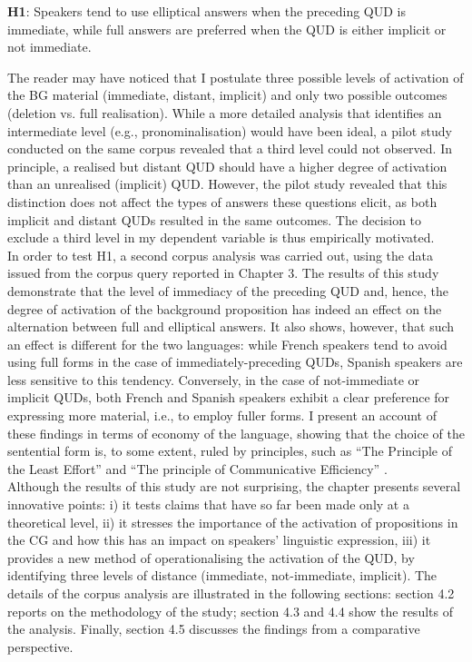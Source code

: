 \ea
\textbf{H1}: Speakers tend to use elliptical answers when the preceding QUD is immediate, while full answers are preferred when the QUD is either implicit or not immediate.\\
\z

The reader may have noticed that I postulate three possible levels of activation of the BG material (immediate, distant, implicit) and only two possible outcomes (deletion vs. full realisation). While a more detailed analysis that identifies an intermediate level (e.g., pronominalisation) would have been ideal, a pilot study conducted on the same corpus revealed that a third level could not observed. In principle, a realised but distant QUD should have a higher degree of activation than an unrealised (implicit) QUD. However, the pilot study revealed that this distinction does not affect the types of answers these questions elicit, as both implicit and distant QUDs resulted in the same outcomes. The decision to exclude a third level in my dependent variable is thus empirically motivated.\\
In order to test H1, a second corpus analysis was carried out, using the data issued from the corpus query reported in Chapter 3. The results of this study demonstrate that the level of immediacy of the preceding QUD and, hence, the degree of activation of the background proposition has indeed an effect on the alternation between full and elliptical answers. It also shows, however, that such an effect is different for the two languages: while French speakers tend to avoid using full forms in the case of immediately-preceding QUDs, Spanish speakers are less sensitive to this tendency. Conversely, in the case of not-immediate or implicit QUDs, both French and Spanish speakers exhibit a clear preference for expressing more material, i.e., to employ fuller forms. I present an account of these findings in terms of economy of the language, showing that the choice of the sentential form is, to some extent, ruled by principles, such as ``The Principle of the Least Effort” \parencite{zipf1949human} and ``The principle of Communicative Efficiency” \parencite{LevshinaMoran+2021, Levshina_2022}.\\
Although the results of this study are not surprising, the chapter presents several innovative points: i) it tests claims that have so far been made only at a theoretical level, ii) it stresses the importance of the activation of propositions in the CG and how this has an impact on speakers' linguistic expression, iii) it provides a new method of operationalising the activation of the QUD, by identifying three levels of distance (immediate, not-immediate, implicit).
The details of the corpus analysis are illustrated in the following sections: section 4.2 reports on the methodology of the study; section 4.3 and 4.4 show the results of the analysis. Finally, section 4.5 discusses the findings from a comparative perspective. 


